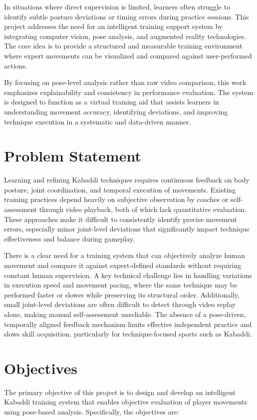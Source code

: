 \documentclass[12pt, a4paper]{report}
\begin{document}
In situations where direct supervision is limited, learners often struggle to identify subtle posture deviations or timing errors during practice sessions. This project addresses the need for an intelligent training support system by integrating computer vision, pose analysis, and augmented reality technologies. The core idea is to provide a structured and measurable training environment where expert movements can be visualized and compared against user-performed actions. 

By focusing on pose-level analysis rather than raw video comparison, this work emphasizes explainability and consistency in performance evaluation. The system is designed to function as a virtual training aid that assists learners in understanding movement accuracy, identifying deviations, and improving technique execution in a systematic and data-driven manner.

\section{Problem Statement}
Learning and refining Kabaddi techniques requires continuous feedback on body posture, joint coordination, and temporal execution of movements. Existing training practices depend heavily on subjective observation by coaches or self-assessment through video playback, both of which lack quantitative evaluation. These approaches make it difficult to consistently identify precise movement errors, especially minor joint-level deviations that significantly impact technique effectiveness and balance during gameplay.

There is a clear need for a training system that can objectively analyze human movement and compare it against expert-defined standards without requiring constant human supervision. A key technical challenge lies in handling variations in execution speed and movement pacing, where the same technique may be performed faster or slower while preserving its structural order. Additionally, small joint-level deviations are often difficult to detect through video replay alone, making manual self-assessment unreliable. The absence of a pose-driven, temporally aligned feedback mechanism limits effective independent practice and slows skill acquisition, particularly for technique-focused sports such as Kabaddi.


\section{Objectives}
The primary objective of this project is to design and develop an intelligent Kabaddi training system that enables objective evaluation of player movements using pose-based analysis. Specifically, the objectives are:
\end{document}
